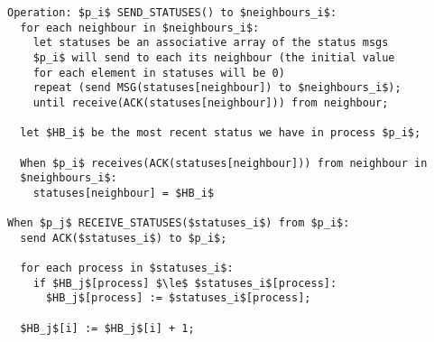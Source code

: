 \documentclass[12pt]{article}
\theoremstyle{plain}
\begin{document}
\begin{lstlisting}[frame=single]
Operation: $p_i$ SEND_STATUSES() to $neighbours_i$:
  for each neighbour in $neighbours_i$:
    let statuses be an associative array of the status msgs
    $p_i$ will send to each its neighbour (the initial value
    for each element in statuses will be 0)
    repeat (send MSG(statuses[neighbour]) to $neighbours_i$);
    until receive(ACK(statuses[neighbour])) from neighbour;

  let $HB_i$ be the most recent status we have in process $p_i$;

  When $p_i$ receives(ACK(statuses[neighbour])) from neighbour in
  $neighbours_i$:
    statuses[neighbour] = $HB_i$

When $p_j$ RECEIVE_STATUSES($statuses_i$) from $p_i$:
  send ACK($statuses_i$) to $p_i$;

  for each process in $statuses_i$:
    if $HB_j$[process] $\le$ $statuses_i$[process]:
      $HB_j$[process] := $statuses_i$[process];

  $HB_j$[i] := $HB_j$[i] + 1;
  
\end{lstlisting}
\end{document}

